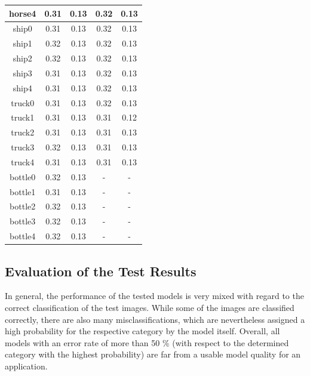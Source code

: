 \begin{longtable} {| c | c | c | c | c |}
 \hline
horse4 \cellcolor{light-gray}	
& 0.31	
& 0.13
& 0.32 	
& 0.13\\
 \hline
ship0 \cellcolor{light-gray}	
& 0.31	
& 0.13
& 0.32 	
& 0.13\\
 \hline
ship1 \cellcolor{light-gray}	
& 0.32	
& 0.13
& 0.32 	
& 0.13\\
 \hline
ship2 \cellcolor{light-gray}	
& 0.32	
& 0.13
& 0.32 	
& 0.13\\
 \hline
ship3 \cellcolor{light-gray}	
& 0.31	
& 0.13
& 0.32 	
& 0.13\\
 \hline
ship4 \cellcolor{light-gray}	
& 0.31	
& 0.13
& 0.32 	
& 0.13\\
 \hline
truck0 \cellcolor{light-gray}	
& 0.31	
& 0.13
& 0.32 	
& 0.13\\
 \hline
truck1 \cellcolor{light-gray}	
& 0.31	
& 0.13
& 0.31 	
& 0.12\\
 \hline
truck2 \cellcolor{light-gray}	
& 0.31	
& 0.13
& 0.31 	
& 0.13\\
 \hline
truck3 \cellcolor{light-gray}	
& 0.32	
& 0.13
& 0.31 	
& 0.13\\
 \hline
truck4 \cellcolor{light-gray}		
& 0.31	
& 0.13
& 0.31 	
& 0.13\\
 \hline
bottle0\cellcolor{light-gray} 	
& 0.32
& 0.13
&  -	 & - \\
 \hline
bottle1\cellcolor{light-gray} 	
& 0.31
& 0.13
&  -	 & - \\
 \hline
bottle2\cellcolor{light-gray} 	
& 0.32
& 0.13
&  -	 & - \\
 \hline
bottle3\cellcolor{light-gray} 	
& 0.32
& 0.13
&  -	 & - \\
 \hline
bottle4\cellcolor{light-gray}
& 0.32
& 0.13	
&  -	 & - \\
 \hline
\end{longtable}

\subsection{Evaluation of the Test Results}

In general, the performance of the tested models is very mixed with regard to the correct classification of the test images. While some of the images are classified correctly, there are also many misclassifications, which are nevertheless assigned a high probability for the respective category by the model itself. Overall, all models with an error rate of more than 50 \% (with respect to the determined category with the highest probability) are far from a usable model quality for an application.

